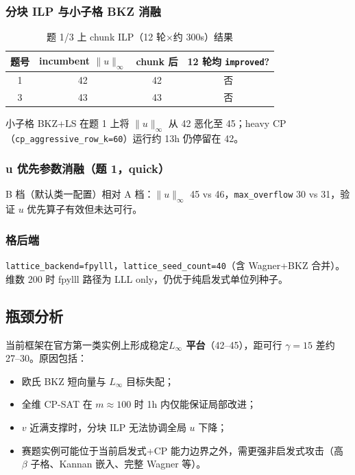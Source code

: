 \documentclass[12pt,a4paper]{ctexart}
\begin{document}
\subsubsection{分块 ILP 与小子格 BKZ 消融}

\begin{table}[htbp]
  \centering
  \caption{题 1/3 上 chunk ILP（12 轮$\times$约 300s）结果}
  \label{tab:chunk}
  \begin{tabular}{cccc}
    \toprule
    题号 & incumbent $\|u\|_{\infty}$ & chunk 后 & 12 轮均 \texttt{improved}? \\
    \midrule
    1 & 42 & 42 & 否 \\
    3 & 43 & 43 & 否 \\
    \bottomrule
  \end{tabular}
\end{table}

小子格 BKZ+LS 在题 1 上将 $\|u\|_{\infty}$ 从 42 恶化至 45；heavy CP（\texttt{cp\_aggressive\_row\_k=60}）运行约 13h 仍停留在 42。

\subsubsection{u 优先参数消融（题 1，quick）}

B 档（默认类一配置）相对 A 档：$\|u\|_{\infty}$ 45 vs 46，\texttt{max\_overflow} 30 vs 31，验证 $u$ 优先算子有效但未达可行。

\subsubsection{格后端}

\texttt{lattice\_backend=fpylll}，\texttt{lattice\_seed\_count=40}（含 Wagner+BKZ 合并）。维数 200 时 fpylll 路径为 LLL only，仍优于纯启发式单位列种子。

\subsection{瓶颈分析}

当前框架在官方第一类实例上形成稳定\textbf{$L_{\infty}$ 平台}（42--45），距可行 $\gamma=15$ 差约 27--30。原因包括：
\begin{itemize}
  \item 欧氏 BKZ 短向量与 $L_{\infty}$ 目标失配；
  \item 全维 CP-SAT 在 $m\approx100$ 时 1h 内仅能保证局部改进；
  \item $v$ 近满支撑时，分块 ILP 无法协调全局 $u$ 下降；
  \item 赛题实例可能位于当前启发式+CP 能力边界之外，需更强非启发式攻击（高 $\beta$ 子格、Kannan 嵌入、完整 Wagner 等）。
\end{itemize}
\end{document}
